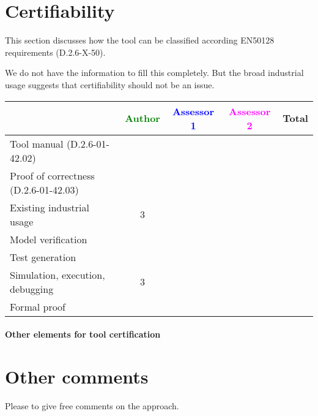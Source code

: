\section{Certifiability}

This section discusses how the tool can be classified according EN50128 requirements (D.2.6-X-50).

\begin{author_comment}
  We do not have the information to fill this completely. But the broad industrial usage suggests that certifiability should not be an issue.
\end{author_comment}

\begin{tabular}{|l | c | c | c | c|}
\hline
& \textcolor{green}{Author} & \textcolor{blue}{Assessor 1} & \textcolor{magenta}{Assessor 2} & Total \\
\hline 
Tool manual (D.2.6-01-42.02) & & & &  \\
\hline
Proof of correctness (D.2.6-01-42.03)   & & & & \\
\hline
Existing industrial  usage  &3 & & & \\
\hline
Model verification & & & & \\
\hline
Test generation & & & & \\
\hline
Simulation, execution, debugging &3 & & & \\
\hline
Formal proof & & & & \\
\hline
\end{tabular}

\paragraph{Other elements for tool certification}

\section{Other comments}
Please to  give free comments on the approach.



